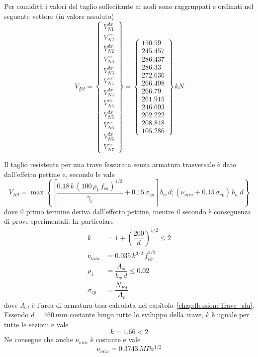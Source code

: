 Per comidità i valori del taglio sollecitante ai nodi sono raggruppati e ordinati nel seguente vettore (in valore assoluto)
\[
\underline{V_{Ed}} = \begin{Bmatrix}
	V_{N1}^{dx} \\  V_{N2}^{sx} \\  V_{N2}^{dx} \\  V_{N3}^{sx} \\  V_{N3}^{dx} \\V_{N4}^{sx} \\  V_{N4}^{dx} \\V_{N5}^{sx} \\  V_{N5}^{dx} \\V_{N6}^{sx} \\  V_{N6}^{dx} \\V_{N7}^{sx}
\end{Bmatrix}
= 
\begin{Bmatrix}
	150.59 \\  245.457 \\  286.437 \\  286.33 \\  272.636 \\  266.498 \\  266.79 \\  261.915 \\  246.693 \\  202.222 \\  208.848 \\  105.286
\end{Bmatrix}\,kN
\]

Il taglio resistente per una trave fessurata senza armatura trasversale è dato dall'effetto pettine e, secondo le \ntc vale
\[
V_{Rd} = \max\left\{\left[\dfrac{0.18\,k\,\left(100\,\rho_1\,f_{ck}\right)^{1/3}}{\gamma_c} + 0.15\,\sigma_{cp}\right]\,b_w\,d; (\nu_{min} + 0.15\,\sigma_{cp})\,b_w\,d\right\}
\]
dove il primo termine deriva dall'effetto pettine, mentre il secondo è conseguenza di prove sperimentali. In particolare
\begin{align*}
	k &= 1+\left(\dfrac{200}{d}\right)^{1/2} \leq 2\\
	\nu_{min} &= 0.035\,k^{3/2}\,f_{ck}^{1/2}\\
	\rho_1 &= \dfrac{A_{sl}}{b_w\,d} \leq 0.02\\
	\sigma_{cp} &= \dfrac{N_{Ed}}{A_c}
\end{align*}
dove $A_{sl}$ è l'area di armatura tesa calcolata nel capitolo~\ref{chap:flessioneTrave_slu}. Essendo $d = 460\,mm$ costante lungo tutto lo sviluppo della trave, $k$ è uguale per tutte le sezioni e vale 
\[k = 1.66 < 2\]
Ne consegue che anche $\nu_{min}$ è costante e vale 
\[
\nu_{min} = 0.3743\,MPa^{1/2}
\]

